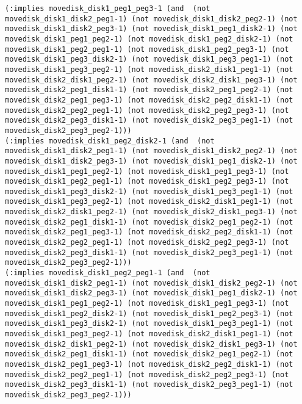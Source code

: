 \documentclass[12pt,letterpaper]{ntdhw}
\begin{document}
\begin{enumerate}
\begin{enumerate}
\begin{lstlisting}[language=pddl, style=pddlstyle,
  basicstyle=\scriptsize]
(:implies movedisk_disk1_peg1_peg3-1 (and  (not movedisk_disk1_disk2_peg1-1) (not movedisk_disk1_disk2_peg2-1) (not movedisk_disk1_disk2_peg3-1) (not movedisk_disk1_peg1_disk2-1) (not movedisk_disk1_peg1_peg2-1) (not movedisk_disk1_peg2_disk2-1) (not movedisk_disk1_peg2_peg1-1) (not movedisk_disk1_peg2_peg3-1) (not movedisk_disk1_peg3_disk2-1) (not movedisk_disk1_peg3_peg1-1) (not movedisk_disk1_peg3_peg2-1) (not movedisk_disk2_disk1_peg1-1) (not movedisk_disk2_disk1_peg2-1) (not movedisk_disk2_disk1_peg3-1) (not movedisk_disk2_peg1_disk1-1) (not movedisk_disk2_peg1_peg2-1) (not movedisk_disk2_peg1_peg3-1) (not movedisk_disk2_peg2_disk1-1) (not movedisk_disk2_peg2_peg1-1) (not movedisk_disk2_peg2_peg3-1) (not movedisk_disk2_peg3_disk1-1) (not movedisk_disk2_peg3_peg1-1) (not movedisk_disk2_peg3_peg2-1)))
(:implies movedisk_disk1_peg2_disk2-1 (and  (not movedisk_disk1_disk2_peg1-1) (not movedisk_disk1_disk2_peg2-1) (not movedisk_disk1_disk2_peg3-1) (not movedisk_disk1_peg1_disk2-1) (not movedisk_disk1_peg1_peg2-1) (not movedisk_disk1_peg1_peg3-1) (not movedisk_disk1_peg2_peg1-1) (not movedisk_disk1_peg2_peg3-1) (not movedisk_disk1_peg3_disk2-1) (not movedisk_disk1_peg3_peg1-1) (not movedisk_disk1_peg3_peg2-1) (not movedisk_disk2_disk1_peg1-1) (not movedisk_disk2_disk1_peg2-1) (not movedisk_disk2_disk1_peg3-1) (not movedisk_disk2_peg1_disk1-1) (not movedisk_disk2_peg1_peg2-1) (not movedisk_disk2_peg1_peg3-1) (not movedisk_disk2_peg2_disk1-1) (not movedisk_disk2_peg2_peg1-1) (not movedisk_disk2_peg2_peg3-1) (not movedisk_disk2_peg3_disk1-1) (not movedisk_disk2_peg3_peg1-1) (not movedisk_disk2_peg3_peg2-1)))
(:implies movedisk_disk1_peg2_peg1-1 (and  (not movedisk_disk1_disk2_peg1-1) (not movedisk_disk1_disk2_peg2-1) (not movedisk_disk1_disk2_peg3-1) (not movedisk_disk1_peg1_disk2-1) (not movedisk_disk1_peg1_peg2-1) (not movedisk_disk1_peg1_peg3-1) (not movedisk_disk1_peg2_disk2-1) (not movedisk_disk1_peg2_peg3-1) (not movedisk_disk1_peg3_disk2-1) (not movedisk_disk1_peg3_peg1-1) (not movedisk_disk1_peg3_peg2-1) (not movedisk_disk2_disk1_peg1-1) (not movedisk_disk2_disk1_peg2-1) (not movedisk_disk2_disk1_peg3-1) (not movedisk_disk2_peg1_disk1-1) (not movedisk_disk2_peg1_peg2-1) (not movedisk_disk2_peg1_peg3-1) (not movedisk_disk2_peg2_disk1-1) (not movedisk_disk2_peg2_peg1-1) (not movedisk_disk2_peg2_peg3-1) (not movedisk_disk2_peg3_disk1-1) (not movedisk_disk2_peg3_peg1-1) (not movedisk_disk2_peg3_peg2-1)))

\end{lstlisting}
\end{enumerate}
\end{enumerate}
\end{document}
